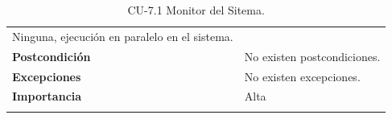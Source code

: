 \begin{longtable}[H]{@{}ll@{}}
\begin{minipage}[t]{0.71\columnwidth}
Ninguna, ejecución en paralelo en el sistema.\strut
\end{minipage}\tabularnewline
\begin{minipage}[t]{0.23\columnwidth}\raggedright\strut
\textbf{Postcondición}\strut
\end{minipage} & \begin{minipage}[t]{0.71\columnwidth}\raggedright\strut
No existen postcondiciones.\strut
\end{minipage}\tabularnewline
\begin{minipage}[t]{0.23\columnwidth}\raggedright\strut
\textbf{Excepciones}\strut
\end{minipage} & \begin{minipage}[t]{0.71\columnwidth}\raggedright\strut
No existen excepciones.\strut
\end{minipage}\tabularnewline
\begin{minipage}[t]{0.23\columnwidth}\raggedright\strut
\textbf{Importancia}\strut
\end{minipage} & \begin{minipage}[t]{0.71\columnwidth}\raggedright\strut
Alta\strut
\end{minipage}\tabularnewline
\bottomrule
\caption{CU-7.1 Monitor del Sitema.}
\end{longtable}